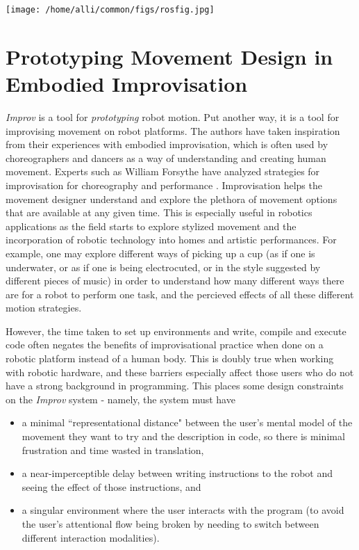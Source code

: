 \documentclass[sigchi-a]{acmart}
\begin{document}
\begin{figure*}
 \centering
\texttt{[image: /home/alli/common/figs/rosfig.jpg]}
\end{figure*}



\section{Prototyping Movement Design in Embodied Improvisation}\label{embodied}

\emph{Improv} is a tool for \emph{prototyping} robot motion. Put another way, it
is a tool for improvising movement on robot platforms. The authors have taken
inspiration from their experiences with embodied improvisation, which is often
used by choreographers and dancers as a way of understanding and creating human
movement. Experts such as William Forsythe have analyzed strategies for
improvisation for choreography and performance \cite{forsythe2004improvisation}.
Improvisation helps the movement designer understand and explore the plethora of
movement options that are available at any given time. This is especially useful
in robotics applications as the field starts to explore stylized movement and
the incorporation of robotic technology into homes and artistic performances. For
example, one may explore different ways of picking up a cup (as if one is
underwater, or as if one is being electrocuted, or in the style suggested by
different pieces of music) in order to understand how many different ways there
are for a robot to perform one task, and the percieved effects of all these
different motion strategies.

However, the time taken to set up environments and write, compile and
execute code often negates the benefits of improvisational practice when done
on a robotic platform instead of a human body. This is
doubly true when working with robotic hardware, and these barriers especially
affect those users who do not have a strong background in programming. This places
some design constraints on the \emph{Improv} system - namely, the system must
have

\begin{itemize}
\item a minimal ``representational
distance" between the user's mental model of the movement they want to try and
the description in code, so there is minimal frustration and time wasted in
translation,
\item a near-imperceptible delay between writing instructions to the robot and
seeing the effect of those instructions, and
\item a singular environment where the
user interacts with the program (to avoid the user's attentional flow being
broken by needing to switch between different interaction modalities).
\end{itemize}
\end{document}
